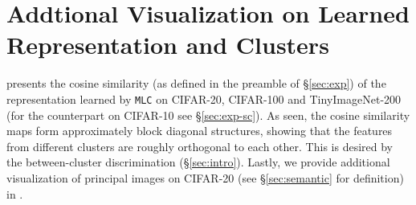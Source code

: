 \documentclass[10pt,twocolumn,letterpaper]{article}
\newcommand{\ours}{MLC}
\newcommand{\mours}{\texttt{\ours}}
\begin{document}
   
   
  
   
   
   \section{Addtional Visualization on Learned Representation and Clusters}
    presents the cosine similarity (as defined in the preamble of \S \ref{sec:exp}) of the representation learned by \mours{} on CIFAR-20, CIFAR-100 and TinyImageNet-200 (for the counterpart on CIFAR-10 see \S \ref{sec:exp-sc}). As seen, the cosine similarity maps form approximately block diagonal structures, showing that the features from different clusters are roughly orthogonal to each other. This is desired by the between-cluster discrimination (\S \ref{sec:intro}). Lastly, we provide additional visualization of principal images on CIFAR-20 (see \S \ref{sec:semantic} for definition) in . 
\end{document}
